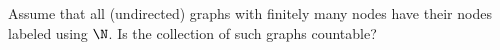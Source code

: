 Assume that all (undirected) graphs with finitely
many nodes have their nodes labeled using 
$\N$. 
Is the collection of such graphs countable?
